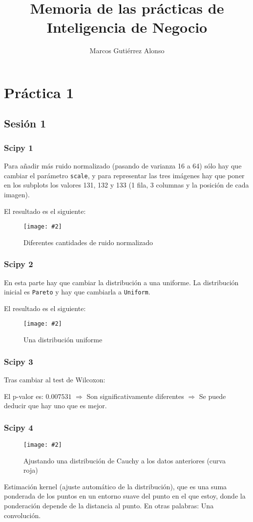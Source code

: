 \documentclass[
12pt, 
spanish, 
singlespacing,
headsepline
]{article}
\author{Marcos Gutiérrez Alonso}
\title{Memoria de las prácticas de Inteligencia de Negocio}
\newcommand{\image}[2]{
\begin{figure}[H]
	\caption{#1}
	\centering
	\texttt{[image: \#2]}
\end{figure}
}
\begin{document}
\begin{titlepage}
	\maketitle
	{\hypersetup{linkcolor=black}
	\tableofcontents
	}
\end{titlepage}

\section{Práctica 1}
\subsection{Sesión 1}
\subsubsection{Scipy 1}
Para añadir más ruido normalizado (pasando de varianza 16 a 64) sólo hay que cambiar el parámetro \texttt{scale}, y para representar las tres imágenes hay que poner en los subplots los valores 131, 132 y 133 (1 fila, 3 columnas y la posición de cada imagen).

El resultado es el siguiente:
\image{Diferentes cantidades de ruido normalizado}{pl1/Figure\_1.png}

\subsubsection{Scipy 2}
En esta parte hay que cambiar la distribución a una uniforme.
La distribución inicial es \texttt{Pareto} y hay que cambiarla a \texttt{Uniform}.

El resultado es el siguiente:
\image{Una distribución uniforme}{pl1/Figure_2.png}

\subsubsection{Scipy 3}
Tras cambiar al test de Wilcoxon: 

El p-valor es: $0.007531$ $\Rightarrow$ Son significativamente diferentes $\Rightarrow$ Se puede deducir que hay uno que es mejor.

\subsubsection{Scipy 4}
\image{Ajustando una distribución de Cauchy a los datos anteriores (curva roja)}{pl1/Figure_4.png}
Estimación kernel (ajuste automático de la distribución), que es una suma ponderada de los puntos en un entorno suave del punto en el que estoy, donde la ponderación depende de la distancia al punto. En otras palabras: Una convolución.
\end{document}

